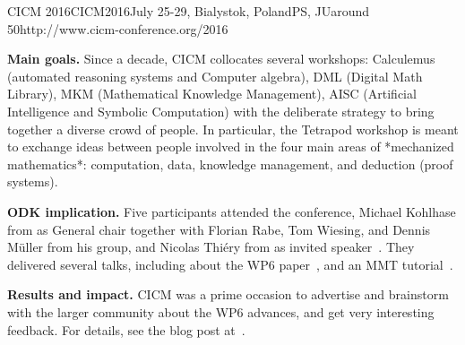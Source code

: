 \begin{event}{CICM 2016}{CICM2016}{July 25-29, Bialystok, Poland}{PS, JU}{around 50}{http://www.cicm-conference.org/2016}

\textbf{Main goals.} Since a decade, CICM collocates several workshops: Calculemus
(automated reasoning systems and Computer algebra), DML (Digital Math
Library), MKM (Mathematical Knowledge Management), AISC (Artificial
Intelligence and Symbolic Computation) with the deliberate strategy to
bring together a diverse crowd of people. In particular, the Tetrapod
workshop is meant to exchange ideas between people involved in the
four main areas of *mechanized mathematics*: computation, data,
knowledge management, and deduction (proof systems).

\textbf{ODK implication.} Five \ODK participants attended the conference, Michael Kohlhase
from  as General chair together with Florian Rabe, Tom Wiesing, and Dennis Müller
from his group, and Nicolas Thiéry from  as invited
speaker~\cite{Thierry:igcscac16}. They delivered several talks, including about the WP6
paper~\cite{DehKohKon:iop16}, and an MMT tutorial~\cite{RabIanMue:ldm16,RabIanMue:adm16}.

\textbf{Results and impact.} CICM was a prime occasion to advertise and brainstorm with
the larger community about the WP6 advances, and get very interesting feedback. For
details, see the blog post at~\cite{Thiery:pdc16}.
\end{event}

